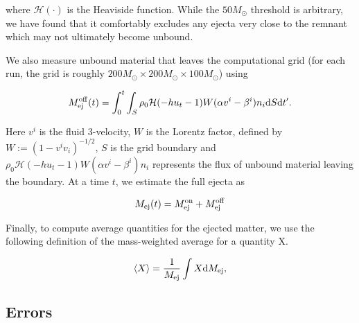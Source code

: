where $\mathcal{H}(\cdot)$ is the Heaviside function. While the $50M_\odot$ threshold is arbitrary, we have found that it comfortably excludes any ejecta very close to the remnant which may not ultimately become unbound.

We also measure unbound material that leaves the computational grid (for each run, the grid is roughly $200M_\odot \times 200M_\odot \times 100M_\odot$) using

\begin{equation}
M^{\rm off}_{\rm ej}(t) = \int^t_0\int_S\rho_0\mathcal{H}(-hu_t - 1) W(\alpha v^i - \beta^i)n_i\mathrm{d}S\mathrm{d}t'.
\end{equation}

Here $v^i$ is the fluid 3-velocity, $W$ is the Lorentz factor, defined by $W := (1-v^iv_i)^{-1/2}$, $S$ is the grid boundary and $\rho_0 \mathcal{H}(-hu_t - 1)W(\alpha v^i - \beta^i)n_i$ represents the flux of unbound material leaving the boundary. At a time $t$, we estimate the full ejecta as

\begin{equation}
M_{\rm ej}(t) = M^{\rm on}_{\rm ej} + M^{\rm off}_{\rm ej}
\end{equation}

Finally, to compute average quantities for the ejected matter, we use the following definition of the mass-weighted average for a quantity X.

\begin{equation}
  \left< X \right> = \frac{1}{M_{\rm ej}}\int X \mathrm{d}M_{\rm ej},
\end{equation}


\subsection{Errors}

